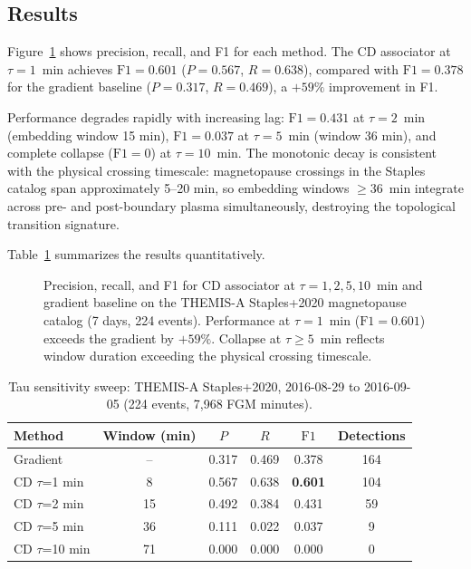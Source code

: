 \documentclass[draft]{agujournal2025}
\begin{document}
\subsection{Results}

Figure~\ref{fig:tau_sweep} shows precision, recall, and F1 for each method.
The CD associator at $\tau=1$~min achieves $\mathrm{F1}=0.601$
($P=0.567$, $R=0.638$), compared with $\mathrm{F1}=0.378$ for the gradient
baseline ($P=0.317$, $R=0.469$), a $+59\%$ improvement in F1.

Performance degrades rapidly with increasing lag:
$\mathrm{F1}=0.431$ at $\tau=2$~min (embedding window 15 min),
$\mathrm{F1}=0.037$ at $\tau=5$~min (window 36 min), and complete
collapse ($\mathrm{F1}=0$) at $\tau=10$~min.
The monotonic decay is consistent with the physical crossing timescale:
magnetopause crossings in the Staples catalog span approximately 5--20 min,
so embedding windows $\geq 36$~min integrate across pre- and post-boundary
plasma simultaneously, destroying the topological transition signature.

Table~\ref{tab:tau_sweep} summarizes the results quantitatively.

\begin{figure}[htbp]
  \centering
  
  \caption{Precision, recall, and F1 for CD associator at $\tau = 1, 2, 5, 10$~min
    and gradient baseline on the THEMIS-A Staples+2020 magnetopause catalog
    (7 days, 224 events).  Performance at $\tau=1$~min ($\mathrm{F1}=0.601$)
    exceeds the gradient by $+59\%$.  Collapse at $\tau \geq 5$~min reflects
    window duration exceeding the physical crossing timescale.}
  \label{fig:tau_sweep}
\end{figure}

\begin{table}[htbp]
  \centering
  \caption{Tau sensitivity sweep: THEMIS-A Staples+2020, 2016-08-29 to 2016-09-05
    (224 events, 7{,}968 FGM minutes).}
  \label{tab:tau_sweep}
  \begin{tabular}{lccccc}
    \toprule
    Method & Window (min) & $P$ & $R$ & $\mathrm{F1}$ & Detections \\
    \midrule
    Gradient       & --  & 0.317 & 0.469 & 0.378 & 164 \\
    CD $\tau$=1 min  &  8  & 0.567 & 0.638 & \textbf{0.601} & 104 \\
    CD $\tau$=2 min  & 15  & 0.492 & 0.384 & 0.431 &  59 \\
    CD $\tau$=5 min  & 36  & 0.111 & 0.022 & 0.037 &   9 \\
    CD $\tau$=10 min & 71  & 0.000 & 0.000 & 0.000 &   0 \\
    \bottomrule
  \end{tabular}
\end{table}
\end{document}
